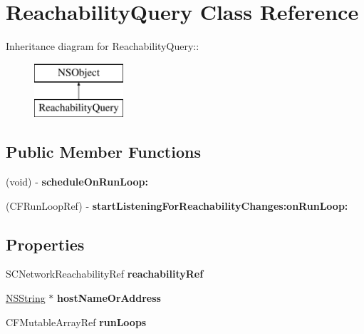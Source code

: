 \hypertarget{interface_reachability_query}{
\section{ReachabilityQuery Class Reference}
\label{interface_reachability_query}
}
Inheritance diagram for ReachabilityQuery::\begin{figure}[H]
\begin{center}
\leavevmode
\includegraphics[height=2cm]{interface_reachability_query}
\end{center}
\end{figure}
\subsection*{Public Member Functions}
\begin{DoxyCompactItemize}
\item 
\hypertarget{interface_reachability_query_a4beafe59623ae5618264054ed971f74b}{
(void) -\/ {\bfseries scheduleOnRunLoop:}}
\label{interface_reachability_query_a4beafe59623ae5618264054ed971f74b}

\item 
\hypertarget{interface_reachability_query_a9c97b2aa8f2a16857f947d2ba7dde985}{
(CFRunLoopRef) -\/ {\bfseries startListeningForReachabilityChanges:onRunLoop:}}
\label{interface_reachability_query_a9c97b2aa8f2a16857f947d2ba7dde985}

\end{DoxyCompactItemize}
\subsection*{Properties}
\begin{DoxyCompactItemize}
\item 
\hypertarget{interface_reachability_query_a2b9ccb5e6783849ac346740d17304a28}{
SCNetworkReachabilityRef {\bfseries reachabilityRef}}
\label{interface_reachability_query_a2b9ccb5e6783849ac346740d17304a28}

\item 
\hypertarget{interface_reachability_query_add3630415071b553a9de75edd986cc10}{
\hyperlink{class_n_s_string}{NSString} $\ast$ {\bfseries hostNameOrAddress}}
\label{interface_reachability_query_add3630415071b553a9de75edd986cc10}

\item 
\hypertarget{interface_reachability_query_a5f52aaa4afece4d726f734a712265fc1}{
CFMutableArrayRef {\bfseries runLoops}}
\label{interface_reachability_query_a5f52aaa4afece4d726f734a712265fc1}

\end{DoxyCompactItemize}


